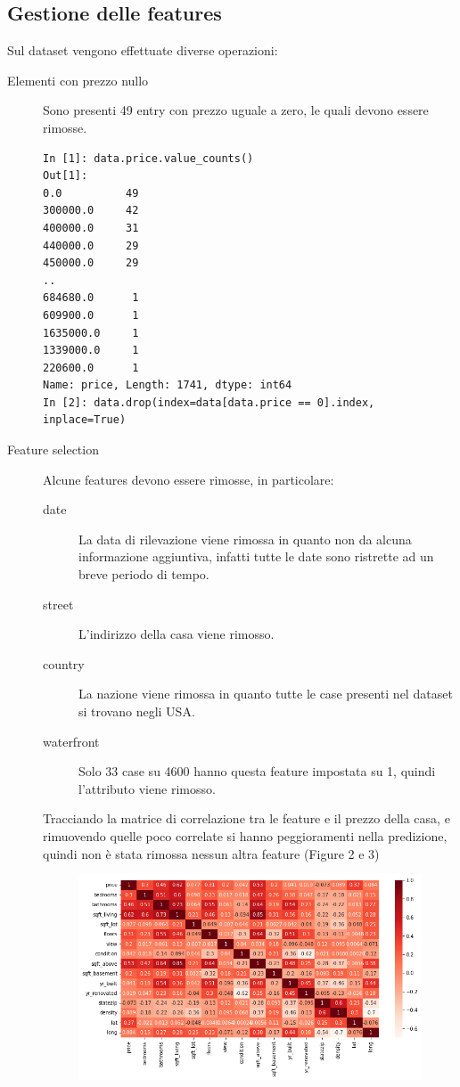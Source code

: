 \documentclass{article}
\begin{document}
\subsection{Gestione delle features}
Sul dataset vengono effettuate diverse operazioni:
\begin{description}
	\item[Elementi con prezzo nullo] Sono presenti 49 entry con prezzo uguale a
		zero, le quali devono essere rimosse.
		\begin{verbatim}
In [1]: data.price.value_counts()
Out[1]:
0.0          49
300000.0     42
400000.0     31
440000.0     29
450000.0     29
..
684680.0      1
609900.0      1
1635000.0     1
1339000.0     1
220600.0      1
Name: price, Length: 1741, dtype: int64
In [2]: data.drop(index=data[data.price == 0].index, inplace=True)
		\end{verbatim}
	\item[Feature selection] Alcune features devono essere rimosse, in
		particolare:
		\begin{description}
			\item[date] La data di rilevazione viene rimossa in quanto non da
				alcuna informazione aggiuntiva, infatti tutte le date sono
				ristrette ad un breve periodo di tempo.
			\item[street] L'indirizzo della casa viene rimosso.
			\item[country] La nazione viene rimossa in quanto tutte le case
				presenti nel dataset si trovano negli USA.
			\item[waterfront] Solo 33 case su 4600 hanno questa feature
				impostata su 1, quindi l'attributo viene rimosso.
		\end{description}
		Tracciando la matrice di correlazione tra le feature e il prezzo della
		casa, e rimuovendo quelle poco correlate si hanno peggioramenti nella
		predizione, quindi non è stata rimossa nessun altra feature (Figure
		2 e 3)
		\begin{figure}[ht]
			\centering
			\begin{minipage}{0.48\textwidth}
				\centering
				\includegraphics[width=\textwidth]{correlazione.png}

\end{minipage}
\end{figure}
\end{description}
\end{document}
